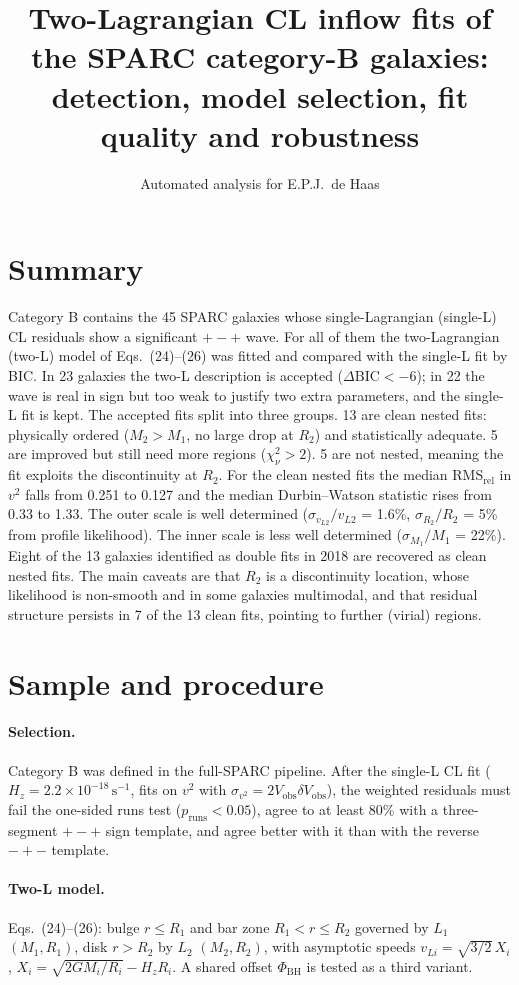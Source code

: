\documentclass[10pt]{article}
\title{\bfseries Two-Lagrangian CL inflow fits of the SPARC category-B galaxies:\\ detection, model selection, fit quality and robustness}
\author{Automated analysis for E.P.J.\ de Haas}\date{}
\begin{document}
\maketitle
\section*{Summary}
Category B contains the 45 SPARC galaxies whose single-Lagrangian (single-L) CL residuals show a significant $+-+$ wave. For all of them the two-Lagrangian (two-L) model of Eqs.~(24)--(26) was fitted and compared with the single-L fit by BIC. In 23 galaxies the two-L description is accepted ($\Delta\mathrm{BIC}<-6$); in 22 the wave is real in sign but too weak to justify two extra parameters, and the single-L fit is kept. The accepted fits split into three groups. 13 are clean nested fits: physically ordered ($M_2>M_1$, no large drop at $R_2$) and statistically adequate. 5 are improved but still need more regions ($\chi^2_\nu>2$). 5 are not nested, meaning the fit exploits the discontinuity at $R_2$. For the clean nested fits the median RMS$_\mathrm{rel}$ in $v^2$ falls from 0.251 to 0.127 and the median Durbin--Watson statistic rises from 0.33 to 1.33. The outer scale is well determined ($\sigma_{v_{L2}}/v_{L2}$ = 1.6\%, $\sigma_{R_2}/R_2$ = 5\% from profile likelihood). The inner scale is less well determined ($\sigma_{M_1}/M_1$ = 22\%). Eight of the 13 galaxies identified as double fits in 2018 are recovered as clean nested fits. The main caveats are that $R_2$ is a discontinuity location, whose likelihood is non-smooth and in some galaxies multimodal, and that residual structure persists in 7 of the 13 clean fits, pointing to further (virial) regions.

\section{Sample and procedure}
\paragraph{Selection.} Category B was defined in the full-SPARC pipeline. After the single-L CL fit ($H_z=2.2\times10^{-18}\,\mathrm{s^{-1}}$, fits on $v^2$ with $\sigma_{v^2}=2V_\mathrm{obs}\delta V_\mathrm{obs}$), the weighted residuals must fail the one-sided runs test ($p_\mathrm{runs}<0.05$), agree to at least 80\% with a three-segment $+-+$ sign template, and agree better with it than with the reverse $-+-$ template.
\paragraph{Two-L model.} Eqs.~(24)--(26): bulge $r\le R_1$ and bar zone $R_1<r\le R_2$ governed by $L_1$ $(M_1,R_1)$, disk $r>R_2$ by $L_2$ $(M_2,R_2)$, with asymptotic speeds $v_{Li}=\sqrt{3/2}\,X_i$, $X_i=\sqrt{2GM_i/R_i}-H_zR_i$. A shared offset $\Phi_\mathrm{BH}$ is tested as a third variant.
\end{document}
